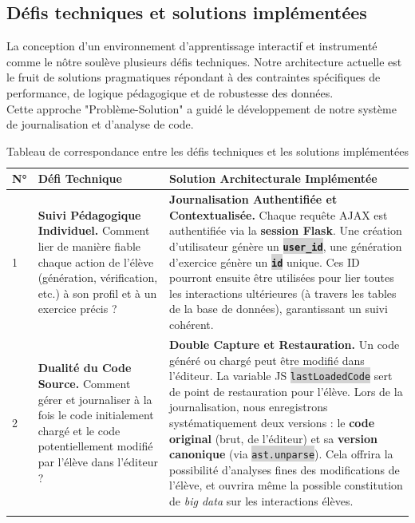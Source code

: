 \documentclass[11pt,a4paper]{article}
\newcommand{\code}[1]{\colorbox{lightgray}{\texttt{\small #1}}}
\begin{document}
\clearpage
\subsection{Défis techniques et solutions implémentées}

La conception d'un environnement d'apprentissage interactif et instrumenté comme le nôtre soulève plusieurs défis techniques. Notre architecture actuelle est le fruit de solutions pragmatiques répondant à des contraintes spécifiques de performance, de logique pédagogique et de robustesse des données.\\ Cette approche "Problème-Solution" a guidé le développement de notre système de journalisation et d'analyse de code.
\begin{table}[htbp]
    \centering
    \caption{Tableau de correspondance entre les défis techniques et les solutions implémentées}
    \label{tab:challenges-solutions} 
    \begin{tabularx}{\textwidth}{@{} l X X @{}}
        \toprule
        \textbf{N°} & \textbf{Défi Technique} & \textbf{Solution Architecturale Implémentée} \\
        \midrule
        
        1 & \textbf{Suivi Pédagogique Individuel.}
            Comment lier de manière fiable chaque action de l'élève (génération, vérification, etc.) à son profil et à un exercice précis ?
            & \textbf{Journalisation Authentifiée et Contextualisée.}
            Chaque requête AJAX est authentifiée via la \textbf{session Flask}. Une création d'utilisateur génère un \textbf{\code{user\_id}}, une génération d'exercice génère un \textbf{\code{id}} unique. Ces ID pourront ensuite être utilisées pour lier toutes les interactions ultérieures (à travers les tables de la base de données), garantissant un suivi cohérent. \\
        \addlinespace

        2 & \textbf{Dualité du Code Source.}
            Comment gérer et journaliser à la fois le code initialement chargé et le code potentiellement modifié par l'élève dans l'éditeur ?
            & \textbf{Double Capture et Restauration.}
            Un code généré ou chargé peut être modifié dans l'éditeur. La variable JS \code{lastLoadedCode} sert de point de restauration pour l'élève. Lors de la journalisation, nous enregistrons systématiquement deux versions : le \textbf{code original} (brut, de l'éditeur) et sa \textbf{version canonique} (via \code{ast.unparse}). Cela offrira la possibilité d'analyses fines des modifications de l'élève, et ouvrira même la possible constitution de \textit{big data} sur les interactions élèves. \\
        \addlinespace


\end{tabularx}
\end{table}
\end{document}
